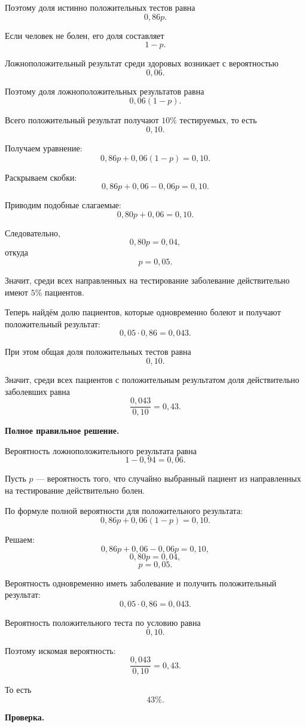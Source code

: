 \documentclass[12pt,a4paper]{article}
\begin{document}
Поэтому доля истинно положительных тестов равна
\[
0{,}86p.
\]

Если человек не болен, его доля составляет
\[
1-p.
\]

Ложноположительный результат среди здоровых возникает с вероятностью
\[
0{,}06.
\]

Поэтому доля ложноположительных результатов равна
\[
0{,}06(1-p).
\]

Всего положительный результат получают $10\%$ тестируемых, то есть
\[
0{,}10.
\]

Получаем уравнение:
\[
0{,}86p+0{,}06(1-p)=0{,}10.
\]

Раскрываем скобки:
\[
0{,}86p+0{,}06-0{,}06p=0{,}10.
\]

Приводим подобные слагаемые:
\[
0{,}80p+0{,}06=0{,}10.
\]

Следовательно,
\[
0{,}80p=0{,}04,
\]
откуда
\[
p=0{,}05.
\]

Значит, среди всех направленных на тестирование заболевание действительно
имеют $5\%$ пациентов.

Теперь найдём долю пациентов, которые одновременно болеют и получают
положительный результат:
\[
0{,}05\cdot0{,}86=0{,}043.
\]

При этом общая доля положительных тестов равна
\[
0{,}10.
\]

Значит, среди всех пациентов с положительным результатом доля действительно
заболевших равна
\[
\frac{0{,}043}{0{,}10}=0{,}43.
\]

\textbf{Полное правильное решение.}

Вероятность ложноположительного результата равна
\[
1-0{,}94=0{,}06.
\]

Пусть $p$ --- вероятность того, что случайно выбранный пациент из
направленных на тестирование действительно болен.

По формуле полной вероятности для положительного результата:
\[
0{,}86p+0{,}06(1-p)=0{,}10.
\]

Решаем:
\[
0{,}86p+0{,}06-0{,}06p=0{,}10,
\]
\[
0{,}80p=0{,}04,
\]
\[
p=0{,}05.
\]

Вероятность одновременно иметь заболевание и получить положительный
результат:
\[
0{,}05\cdot0{,}86=0{,}043.
\]

Вероятность положительного теста по условию равна
\[
0{,}10.
\]

Поэтому искомая вероятность:
\[
\frac{0{,}043}{0{,}10}=0{,}43.
\]

То есть
\[
43\%.
\]

\textbf{Проверка.}
\end{document}

